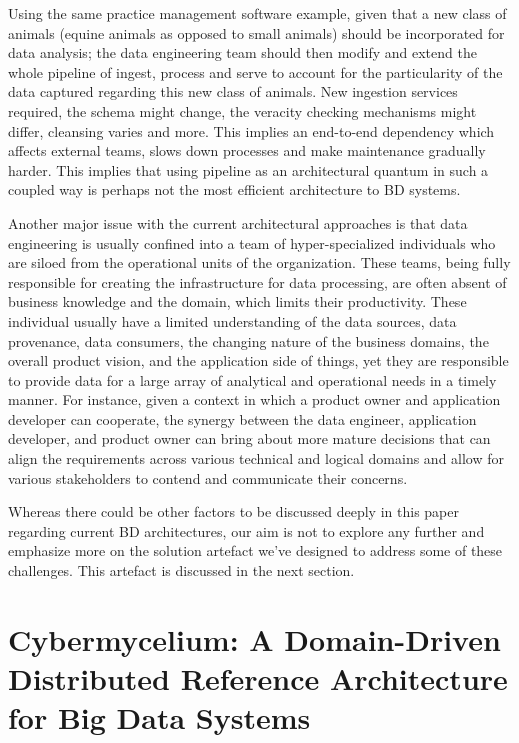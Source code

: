 \documentclass[review]{elsarticle}
\begin{document}
Using the same practice management software example, given that a new class of animals (equine animals as opposed to small animals) should be incorporated for data analysis; the data engineering team should then modify and extend the whole pipeline of ingest, process and serve to account for the particularity of the data captured regarding this new class of animals. New ingestion services required, the schema might change, the veracity checking mechanisms might differ, cleansing varies and more. This implies an end-to-end dependency which affects external teams, slows down processes and make maintenance gradually harder. This implies that using pipeline as an architectural quantum in such a coupled way is perhaps not the most efficient architecture to BD systems.

Another major issue with the current architectural approaches is that data engineering is usually confined into a team of hyper-specialized individuals who are siloed from the operational units of the organization. These teams, being fully responsible for creating the infrastructure for data processing, are often absent of business knowledge and the domain, which limits their productivity. These individual usually have a limited understanding of the data sources, data provenance, data consumers, the changing nature of the business domains, the overall product vision, and the application side of things, yet they are responsible to provide data for a large array of analytical and operational needs in a timely manner. For instance, given a context in which a product owner and application developer can cooperate, the synergy between the data engineer, application developer, and product owner can bring about more mature decisions that can align the requirements across various technical and logical domains and allow for various stakeholders to contend and communicate their concerns.

Whereas there could be other factors to be discussed deeply in this paper regarding current BD architectures, our aim is not to explore any further and emphasize more on the solution artefact we've designed to address some of these challenges. This artefact is discussed in the next section.

\section{Cybermycelium: A Domain-Driven Distributed Reference Architecture for Big Data Systems} \label{artifact-section}
\end{document}
